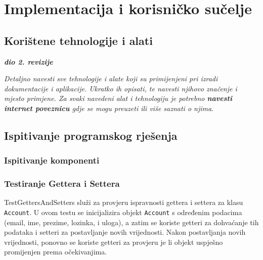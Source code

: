 \chapter{Implementacija i korisničko sučelje}
		
		
		\section{Korištene tehnologije i alati}
		
			\textbf{\textit{dio 2. revizije}}
			
			 \textit{Detaljno navesti sve tehnologije i alate koji su primijenjeni pri izradi dokumentacije i aplikacije. Ukratko ih opisati, te navesti njihovo značenje i mjesto primjene. Za svaki navedeni alat i tehnologiju je potrebno \textbf{navesti internet poveznicu} gdje se mogu preuzeti ili više saznati o njima}.
			
			
			\eject 
		
	
		\section{Ispitivanje programskog rješenja}

			\subsection{Ispitivanje komponenti}
			
			\subsection{Testiranje Gettera i Settera}

			TestGettersAndSetters služi za provjeru ispravnosti gettera i settera za klasu \texttt{Account}. U ovom testu se inicijalizira objekt \texttt{Account} s određenim podacima (email, ime, prezime, lozinka, i uloga), a zatim se koriste getteri za dohvaćanje tih podataka i setteri za postavljanje novih vrijednosti. Nakon postavljanja novih vrijednosti, ponovno se koriste getteri za provjeru je li objekt uspješno promijenjen prema očekivanjima.

